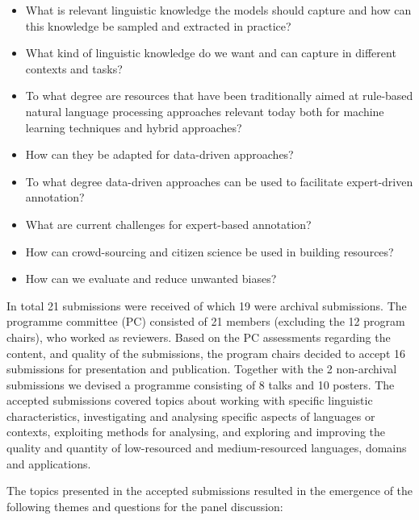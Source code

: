 \begin{itemize}
    \item What is relevant linguistic knowledge the models should capture and how can this knowledge be sampled and extracted in practice?
    \item What kind of linguistic knowledge do we want and can capture in different contexts and tasks?
    \item To what degree are resources that have been traditionally aimed at rule-based natural language processing approaches relevant today both for machine learning techniques and hybrid approaches?
    \item How can they be adapted for data-driven approaches?
    \item To what degree data-driven approaches can be used to facilitate expert-driven annotation?
    \item What are current challenges for expert-based annotation?
    \item How can crowd-sourcing and citizen science be used in building resources?
    \item How can we evaluate and reduce unwanted biases?
\end{itemize}

In total 21 submissions were received of which 19 were archival submissions. The programme committee (PC) consisted of 21 members (excluding the 12 program chairs), who worked as reviewers. Based on the PC assessments regarding the content, and quality of the submissions, the program chairs decided to accept 16 submissions for presentation and publication. Together with the 2 non-archival submissions we devised a programme consisting of 8 talks and 10 posters. The accepted submissions covered topics about working with specific linguistic characteristics, investigating and analysing specific aspects of languages or contexts, exploiting methods for analysing, and exploring and improving the quality and quantity of low-resourced and medium-resourced languages, domains and applications. 

The topics presented in the accepted submissions resulted in the emergence of the following themes and questions for the panel discussion:

